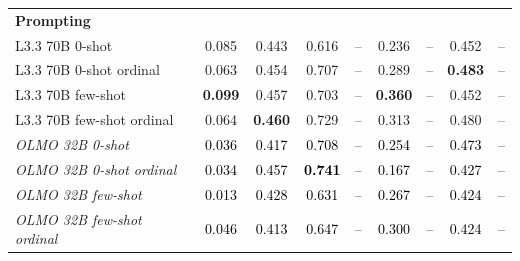 \begin{table}[htbp]
\begin{ChSevenFloatBody}
{\begin{tabular}{lcccccccc}
\textbf{Prompting} &&&&&&&&\\
L3.3 70B 0-shot & 0.085 & 0.443 & 0.616 & -- & 0.236 & -- & 0.452 & -- \\
L3.3 70B 0-shot ordinal & 0.063 & 0.454 & 0.707 & -- & 0.289 & -- & \textbf{0.483} & -- \\
L3.3 70B few-shot & \textbf{0.099} & 0.457 & 0.703 & -- & \textbf{0.360} & -- & 0.452 & -- \\
L3.3 70B few-shot ordinal & 0.064 & \textbf{0.460} & 0.729 & -- & 0.313 & -- & 0.480 & -- \\
\textit{OLMO 32B 0-shot} & \textcolor{black}{0.036} & \textcolor{black}{0.417} & \textcolor{black}{0.708} & \textcolor{black}{--} & \textcolor{black}{0.254} & \textcolor{black}{--} & \textcolor{black}{0.473} & \textcolor{black}{--} \\
\textit{OLMO 32B 0-shot ordinal} & \textcolor{black}{0.034} & \textcolor{black}{0.457} & \textcolor{black}{\textbf{0.741}} & \textcolor{black}{--} & \textcolor{black}{0.167} & \textcolor{black}{--} & \textcolor{black}{0.427} & \textcolor{black}{--} \\
\textit{OLMO 32B few-shot} & \textcolor{black}{0.013} & \textcolor{black}{0.428} & \textcolor{black}{0.631} & \textcolor{black}{--} & \textcolor{black}{0.267} & \textcolor{black}{--} & \textcolor{black}{0.424} & \textcolor{black}{--} \\
\textit{OLMO 32B few-shot ordinal} & \textcolor{black}{0.046} & \textcolor{black}{0.413} & \textcolor{black}{0.647} & \textcolor{black}{--} & \textcolor{black}{0.300} & \textcolor{black}{--} & \textcolor{black}{0.424} & \textcolor{black}{--} \\


\end{tabular}}
\end{ChSevenFloatBody}
\end{table}
